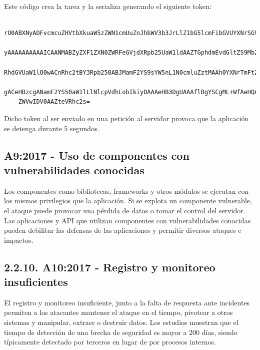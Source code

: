 Este código crea la tarea y la serializa generando el siguiente token:

\begin{verbatim}
    rO0ABXNyADFvcmcuZHVtbXkuaW5zZWN1cmUuZnJhbWV3b3JrLlZ1bG5lcmFibGVUYXNrSG9sZGV
    yAAAAAAAAAAICAANMABZyZXF1ZXN0ZWRFeGVjdXRpb25UaW1ldAAZTGphdmEvdGltZS9Mb2NhbE
    RhdGVUaW1lO0wACnRhc2tBY3Rpb250ABJMamF2YS9sYW5nL1N0cmluZztMAAh0YXNrTmFtZXEAf
    gACeHBzcgANamF2YS50aW1lLlNlcpVdhLobIkiyDAAAeHB3DgUAAAflBgYSCgML+WfAeHQAB3Ns
    ZWVwIDV0AAZteVRhc2s=
\end{verbatim}

Dicho token al ser enviado en una petición al servidor provoca que la aplicación se detenga durante 5 segundos.

\newpage
\subsection{A9:2017 - Uso de componentes con vulnerabilidades conocidas}

Los componentes como bibliotecas, frameworks y otros módulos se ejecutan con los mismos
privilegios que la aplicación. Si se explota un componente vulnerable, el ataque puede provocar
una pérdida de datos o tomar el control del servidor. Las aplicaciones y API que utilizan
componentes con vulnerabilidades conocidas pueden debilitar las defensas de las aplicaciones y
permitir diversos ataques e impactos.

\subsection{2.2.10. A10:2017 - Registro y monitoreo insuficientes}

El registro y monitoreo insuficiente, junto a la falta de respuesta ante incidentes permiten a los
atacantes mantener el ataque en el tiempo, pivotear a otros sistemas y manipular, extraer o
destruir datos. Los estudios muestran que el tiempo de detección de una brecha de seguridad es
mayor a 200 días, siendo típicamente detectado por terceros en lugar de por procesos internos. 

\clearpage
\newpage
